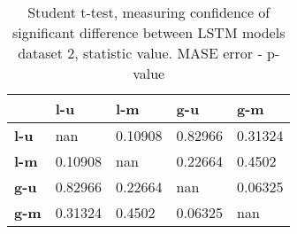 \begin{table}[H]
\centering
\caption{Student t-test, measuring confidence of significant difference between LSTM models dataset 2, statistic value. MASE error - p-value}
\label{table:ttest-p-values-lstm-experiments-MASE-dataset-2}
\begin{tabular}{lllll}
\toprule
{} &      l-u &      l-m &      g-u &      g-m \\
\midrule
\textbf{l-u} &      nan &  0.10908 &  0.82966 &  0.31324 \\
\textbf{l-m} &  0.10908 &      nan &  0.22664 &   0.4502 \\
\textbf{g-u} &  0.82966 &  0.22664 &      nan &  0.06325 \\
\textbf{g-m} &  0.31324 &   0.4502 &  0.06325 &      nan \\
\bottomrule
\end{tabular}
\end{table}
